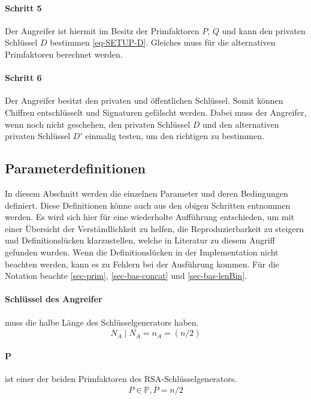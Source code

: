             \paragraph{Schritt 5} \label{sec-Schritt-Ang 5} Der Angreifer ist hiermit im Besitz der Primfaktoren $P$, $Q$ und kann den privaten Schlüssel $D$ bestimmen \eqref{eq-SETUP-D}. Gleiches muss für die alternativen Primfaktoren berechnet werden.

            \paragraph{Schritt 6} \label{sec-Schritt-Ang 6} Der Angreifer besitzt den privaten und öffentlichen Schlüssel. Somit können Chiffren entschlüsselt und Signaturen gefälscht werden. Dabei muss der Angreifer, wenn noch nicht geschehen, den privaten Schlüssel $D$ und den alternativen privaten Schlüssel $D'$ einmalig testen, um den richtigen zu bestimmen.
        
        \subsection{Parameterdefinitionen}
            In diesem Abschnitt werden die einzelnen Parameter und deren Bedingungen definiert. Diese Definitionen könne auch aus den obigen Schritten entnommen werden. Es wird sich hier für eine wiederholte Aufführung entschieden, um mit einer Übersicht der Verständlichkeit zu helfen, die Reproduzierbarkeit zu steigern und Definitionslücken klarzustellen, welche in Literatur zu diesem Angriff gefunden wurden. Wenn die Definitionslücken in der Implementation nicht beachten werden, kann es zu Fehlern bei der Ausführung kommen. Für die Notation beachte \ref{sec-prim}, \ref{sec-bas-concat} und \ref{sec-bas-lenBin}.

            \paragraph{Schlüssel des Angreifer} muss die halbe Länge des Schlüsselgenerators haben.
                \begin{equation}
                    N_{A} \mid \overline{N_{A}} = n_{A} = (n/2)
                \end{equation}

            \paragraph{P} ist einer der beiden Primfaktoren des \ac{RSA}-Schlüsselgenerators. 
                \begin{equation}
                    P \in \mathbb{P}, \overline{P} = n/2
                \end{equation}
            
